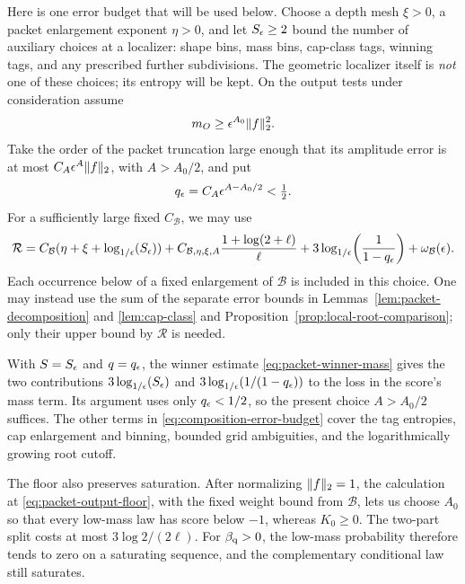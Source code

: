 Here is one error budget that will be used below.  Choose a depth mesh
$\xi>0$, a packet enlargement exponent $\eta>0$, and let
$S_\epsilon\ge2$ bound the number of auxiliary choices at a localizer:
shape bins, mass bins, cap-class tags, winning tags, and any prescribed
further subdivisions.  The geometric localizer itself is \emph{not}
one of these choices; its entropy will be kept.  On the output tests
under consideration assume
\begin{equation}\label{eq:composition-mass-floor}
 m_O\ge\epsilon^{A_0}\lVert f\rVert_2^2.
\end{equation}
Take the order of the packet truncation large enough that its amplitude
error is at most $C_A\epsilon^A\lVert f\rVert_2$, with $A>A_0/2$, and put
\[
 q_\epsilon=C_A\epsilon^{A-A_0/2}<\tfrac12.
\]
For a sufficiently large fixed $C_{\mathcal B}$, we may use
\begin{equation}\label{eq:composition-error-budget}
 \mathcal R=
 C_{\mathcal B}(\eta+\xi+\log_{1/\epsilon}\!\left(S_\epsilon\right))
 +C_{\mathcal B,\eta,\xi,A}
       \frac{1+\log(2+\ell)}{\ell}
 +3\log_{1/\epsilon}\!\left(\frac1{1-q_\epsilon}\right)
 +\omega_{\mathcal B}(\epsilon).
\end{equation}
Each occurrence below of a fixed enlargement of $\mathcal B$ is included
in this choice.  One may instead use the sum of the separate error
bounds in Lemmas~\ref{lem:packet-decomposition} and
\ref{lem:cap-class} and Proposition~\ref{prop:local-root-comparison};
only their upper bound by $\mathcal R$ is needed.

With $S=S_\epsilon$ and $q=q_\epsilon$, the winner estimate
\eqref{eq:packet-winner-mass} gives the two contributions
$3\log_{1/\epsilon}\!\left(S_\epsilon\right)$ and $3\log_{1/\epsilon}\!\left(1/(1-q_\epsilon)\right)$ to the loss
in the score's mass term.
Its argument uses only $q_\epsilon<1/2$, so the present choice
$A>A_0/2$ suffices.  The other terms in
\eqref{eq:composition-error-budget} cover the tag entropies, cap
enlargement and binning, bounded grid ambiguities, and the
logarithmically growing root cutoff.

The floor also preserves saturation.  After normalizing $\lVert f\rVert_2=1$, the calculation at
\eqref{eq:packet-output-floor}, with the fixed weight bound from $\mathcal B$, lets
us choose $A_0$ so that every low-mass law has score below $-1$,
whereas $K_0\ge0$.  The two-part split costs at most
$3\log 2/(2\ell)$.  For $\beta_{\mathrm q}>0$, the low-mass probability
therefore tends to zero on a saturating sequence, and the
complementary conditional law still saturates.

